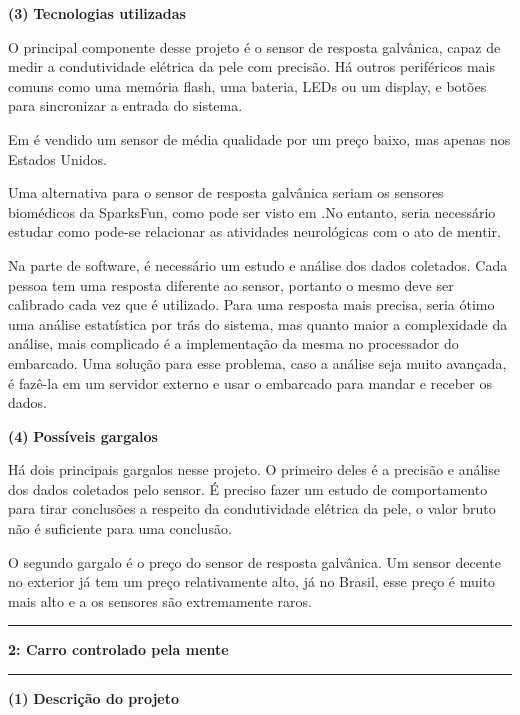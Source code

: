 \documentclass[11pt]{article}
\newcommand\question[2]{\vspace{.25in}\hrule\textbf{#1: #2}\vspace{.5em}\hrule\vspace{.10in}}
\renewcommand\part[1]{\vspace{.10in}\textbf{(#1)}}
\newcommand\descricao{\vspace{.10in}\textbf{Descrição do projeto }}
\newcommand\componentes{\vspace{.10in}\textbf{Tecnologias utilizadas}}
\newcommand\gargalos{\vspace{.10in}\textbf{Possíveis gargalos}}
\begin{document}
\raggedright
\part{3} \componentes

\RaggedRight O principal componente desse projeto é o sensor de resposta galvânica, capaz de medir a 
condutividade elétrica da pele com precisão. Há outros periféricos mais comuns como uma memória flash, uma bateria, LEDs ou um display, e botões para sincronizar a entrada do sistema. 

Em \cite{gsr_sensor} é vendido um sensor de média qualidade por um preço baixo, mas apenas nos Estados Unidos.

Uma alternativa para o sensor de resposta galvânica seriam os sensores biomédicos da SparksFun, como pode ser visto em \cite{biomedic_sensor}.No entanto, seria necessário estudar como pode-se relacionar as atividades neurológicas com o ato de mentir.

Na parte de software, é necessário um estudo e análise dos dados coletados. Cada pessoa tem uma resposta diferente ao sensor, portanto o mesmo deve ser calibrado cada vez que é utilizado. Para uma resposta mais precisa, seria ótimo uma análise estatística por trás do sistema, mas quanto maior a complexidade da análise, mais complicado é a implementação da mesma no processador do embarcado. Uma solução para esse problema, caso a análise seja muito avançada, é fazê-la em um servidor externo e usar o embarcado para mandar e receber os dados.


\raggedright
\part{4} \gargalos

\RaggedRight Há dois principais gargalos nesse projeto. O primeiro deles é a precisão e análise dos dados coletados pelo sensor. É preciso fazer um estudo de comportamento para tirar conclusões a respeito da condutividade elétrica da pele, o valor bruto não é suficiente para uma conclusão.

O segundo gargalo é o preço do sensor de resposta galvânica. Um sensor decente no exterior já tem um preço relativamente alto, já no Brasil, esse preço é muito mais alto e a os sensores são extremamente raros.


\raggedright
\question{2}{Carro controlado pela mente}

\part{1} \descricao
\end{document}
